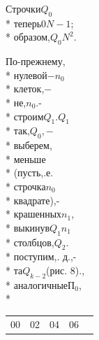 \documentclass{article}
\begin{document}
\begin{multicols}{2}
Строчки\hfill$Q_0$\\*
теперь\hfill0\hfill$N-1$;\\*
образом,\hfill$Q_0$\hfill$N^2$.

По-прежнему,\\*
нулевой\hfill$- n_0$\\*
клеток,\hfill$-$\\*
не,\hfill$n_0$.-\\*
строим\hfill$Q_1$.\hfill$Q_1$\\*
так,\hfill$Q_0, -$\\*
выберем,\\*
меньше\\*
(пусть,.е.\\*
строчка\hfill$n_0$\\*
квадрате),-\\*
крашенных\hfill$n_1$,\\*
выкинув\hfill$Q_1$\hfill$n_1$\\*
столбцов,\hfill$Q_2$.\\*
поступим,. д.,-\\*
та\hfill$Q_{k-2}$\hfill(рис. 8).,\\*
аналогичные\hfill$П_0$,\\*
\begin{center}
\begin{tabularx}{0.47\textwidth} { 
  | >{\centering\arraybackslash}X
  | >{\centering\arraybackslash}X
  | >{\centering\arraybackslash}X 
  | >{\centering\arraybackslash}X 
  | >{\centering\arraybackslash}X  | }
 \hline
 \vspace*{-2.2mm}00\vspace*{0.5mm} & \vspace*{-2.2mm}02\vspace*{0.5mm}
 & \vspace*{-2.2mm}04\vspace*{0.5mm} &  \vspace*{-2.2mm}06\vspace*{0.5mm}

\end{tabularx}
\end{center}
\end{multicols}
\end{document}
